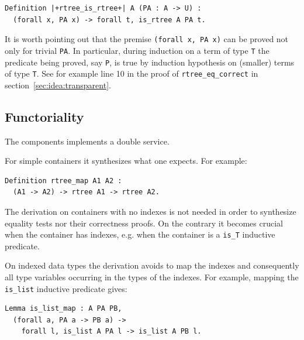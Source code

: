 \documentclass[sigplan,10pt,review]{acmart}\settopmatter{printfolios=true,printccs=false,printacmref=false}
\newcommand{\derive}[1]{\keys{#1}}
\begin{document}
\begin{minipage}{\textwidth}\begin{lstlisting}
Definition |+rtree_is_rtree+| A (PA : A -> U) :
  (forall x, PA x) -> forall t, is_rtree A PA t.
\end{lstlisting}\end{minipage}

\noindent
It is worth pointing out that the premise
\lstinline+(forall x, PA x)+ can be proved not only for
trivial \lstinline+PA+. In particular, during induction
on a term of type \lstinline+T+ the predicate being
proved, say \lstinline+P+, is true by induction hypothesis
on (smaller) terms of type \lstinline+T+. See for example
line 10 in the proof of \lstinline+rtree_eq_correct+ in
section~\ref{sec:idea:transparent}.


\subsection{Functoriality} %

The \derive{map} components implements a double service.

For simple containers it synthesizes what one expects. For example:

\begin{minipage}{\textwidth}\begin{lstlisting}
Definition rtree_map A1 A2 :
  (A1 -> A2) -> rtree A1 -> rtree A2.
\end{lstlisting}\end{minipage}

The derivation on containers with no indexes is not needed in order
to synthesize equality tests nor their correctness proofs.
On the contrary it becomes crucial when the container has indexes,
e.g. when the container is a \lstinline+is_T+ inductive predicate.

On indexed data types the derivation avoids to map the indexes and
consequently all type variables occurring in the types of the indexes.
For example, mapping the \lstinline+is_list+ inductive predicate gives:

\begin{minipage}{\textwidth}\begin{lstlisting}
Lemma is_list_map : A PA PB,
  (forall a, PA a -> PB a) ->
    forall l, is_list A PA l -> is_list A PB l.
\end{lstlisting}\end{minipage}
\end{document}
